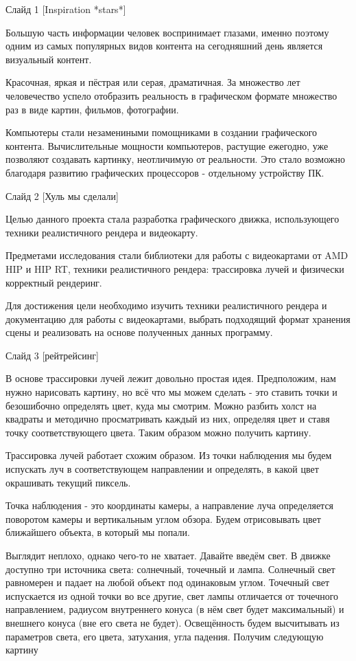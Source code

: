 \documentclass[a4paper,14pt]{extarticle}
\begin{document}
\linespread{1.3}
	\setlength{\parskip}{0cm}

Слайд 1 [Inspiration *stars*]

Большую часть информации человек воспринимает глазами, 
именно поэтому одним из самых популярных видов контента на сегодняшний день 
является визуальный контент.

Красочная, яркая и пёстрая или серая, драматичная. За множество лет человечество успело
отобразить реальность в графическом формате множество раз в виде картин, фильмов, фотографии.

Компьютеры стали незамениными помощниками в создании графического контента.
Вычислительные мощности компьютеров, растущие ежегодно, уже позволяют создавать картинку, неотличимую от реальности.
Это стало возможно благодаря развитию графических процессоров - отдельному устройству ПК.

Слайд 2 [Хуль мы сделали]

Целью данного проекта стала разработка графического движка, использующего техники реалистичного рендера и видеокарту.

Предметами исследования стали библиотеки для работы с видеокартами от AMD HIP и HIP RT, 
техники реалистичного рендера: трассировка лучей и физически корректный рендеринг.

Для достижения цели необходимо изучить техники реалистичного рендера и документацию для работы с видеокартами, 
выбрать подходящий формат хранения сцены и реализовать на основе полученных данных программу.

Слайд 3 [рейтрейсинг]

В основе трассировки лучей лежит довольно простая идея. Предположим, нам нужно нарисовать картину, но 
всё что мы можем сделать - это ставить точки и безошибочно определять цвет, куда мы смотрим.
Можно разбить холст на квадраты и методично просматривать каждый из них, определяя цвет и ставя точку соответствующего цвета.
Таким образом можно получить картину. 

Трассировка лучей работает схожим образом. Из точки наблюдения мы будем испускать луч в соответствующем направлении и определять, 
в какой цвет окрашивать текущий пиксель.  

Точка наблюдения - это координаты камеры, а направление луча определяется поворотом камеры и вертикальным углом обзора. 
Будем отрисовывать цвет ближайшего объекта, в который мы попали.

Выглядит неплохо, однако чего-то не хватает. Давайте введём свет. В движке доступно три источника света: 
солнечный, точечный и лампа. Солнечный свет равномерен и падает на любой объект под одинаковым углом. 
Точечный свет испускается из одной точки во все другие, свет лампы отличается от точечного направлением, 
радиусом внутреннего конуса (в нём свет будет максимальный) и внешнего конуса (вне его света не будет). 
Освещённость будем высчитывать из параметров света, его цвета, затухания, угла падения. Получим следующую картину
\end{document}
